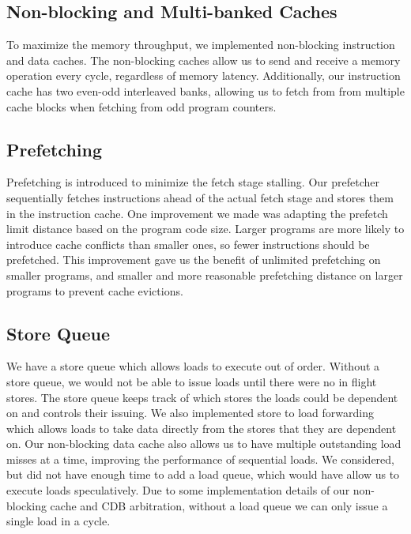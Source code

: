 \documentclass[10pt,journal,compsoc]{IEEEtran}
\begin{document}
\subsection{Non-blocking and Multi-banked Caches}
To maximize the memory throughput, we implemented non-blocking instruction and data caches. The non-blocking caches allow us to send and receive a memory operation every cycle, regardless of memory latency. Additionally, our instruction cache has two even-odd interleaved banks, allowing us to fetch from from multiple cache blocks when fetching from odd program counters.

\subsection{Prefetching}
Prefetching is introduced to minimize the fetch stage stalling. Our prefetcher sequentially fetches instructions ahead of the actual fetch stage and stores them in the instruction cache. One improvement we made was adapting the prefetch limit distance based on the program code size. Larger programs are more likely to introduce cache conflicts than smaller ones, so fewer instructions should be prefetched. This improvement gave us the benefit of unlimited prefetching on smaller programs, and smaller and more reasonable prefetching distance on larger programs to prevent cache evictions.

\subsection{Store Queue}
We have a store queue which allows loads to execute out of order. Without a store queue, we would not be able to issue loads until there were no in flight stores. The store queue keeps track of which stores the loads could be dependent on and controls their issuing. We also implemented store to load forwarding which allows loads to take data directly from the stores that they are dependent on. Our non-blocking data cache also allows us to have multiple outstanding load misses at a time, improving the performance of sequential loads. We considered, but did not have enough time to add a load queue, which would have allow us to execute loads speculatively. Due to some implementation details of our non-blocking cache and CDB arbitration, without a load queue we can only issue a single load in a cycle.
\end{document}
